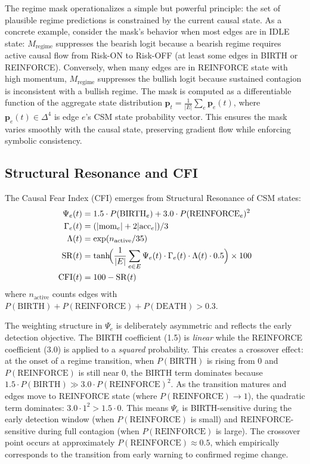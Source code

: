 \documentclass[11pt]{article}
\newcommand{\CFI}{\mathrm{CFI}}
\newcommand{\SR}{\mathrm{SR}}
\begin{document}
The regime mask operationalizes a simple but powerful principle: the set of plausible regime predictions is constrained by the current causal state. As a concrete example, consider the mask's behavior when most edges are in IDLE state: $M_{\text{regime}}$ suppresses the bearish logit because a bearish regime requires active causal flow from Risk-ON to Risk-OFF (at least some edges in BIRTH or REINFORCE). Conversely, when many edges are in REINFORCE state with high momentum, $M_{\text{regime}}$ suppresses the bullish logit because sustained contagion is inconsistent with a bullish regime. The mask is computed as a differentiable function of the aggregate state distribution $\mathbf{p}_t = \frac{1}{|E|}\sum_e \mathbf{p}_e(t)$, where $\mathbf{p}_e(t) \in \Delta^4$ is edge $e$'s CSM state probability vector. This ensures the mask varies smoothly with the causal state, preserving gradient flow while enforcing symbolic consistency.

\subsection{Structural Resonance and CFI}

The Causal Fear Index (CFI) emerges from Structural Resonance of CSM states:
\begin{align}
    \Psi_e(t) &= 1.5 \cdot P(\text{BIRTH}_e) + 3.0 \cdot P(\text{REINFORCE}_e)^2 \\
    \Gamma_e(t) &= (|\text{mom}_e| + 2|\text{acc}_e|) / 3 \\
    \Lambda(t) &= \exp(n_{\text{active}} / 35) \\
    \SR(t) &= \tanh\!\Bigl(\frac{1}{|E|}\sum_{e \in E} \Psi_e(t) \cdot \Gamma_e(t) \cdot \Lambda(t) \cdot 0.5\Bigr) \times 100 \\
    \CFI(t) &= 100 - \SR(t)
\end{align}
where $n_{\text{active}}$ counts edges with $P(\text{BIRTH}) + P(\text{REINFORCE}) + P(\text{DEATH}) > 0.3$.

The weighting structure in $\Psi_e$ is deliberately asymmetric and reflects the early detection objective. The BIRTH coefficient (1.5) is \emph{linear} while the REINFORCE coefficient (3.0) is applied to a \emph{squared} probability. This creates a crossover effect: at the onset of a regime transition, when $P(\text{BIRTH})$ is rising from 0 and $P(\text{REINFORCE})$ is still near 0, the BIRTH term dominates because $1.5 \cdot P(\text{BIRTH}) \gg 3.0 \cdot P(\text{REINFORCE})^2$. As the transition matures and edges move to REINFORCE state (where $P(\text{REINFORCE}) \to 1$), the quadratic term dominates: $3.0 \cdot 1^2 > 1.5 \cdot 0$. This means $\Psi_e$ is BIRTH-sensitive during the early detection window (when $P(\text{REINFORCE})$ is small) and REINFORCE-sensitive during full contagion (when $P(\text{REINFORCE})$ is large). The crossover point occurs at approximately $P(\text{REINFORCE}) \approx 0.5$, which empirically corresponds to the transition from early warning to confirmed regime change.
\end{document}
